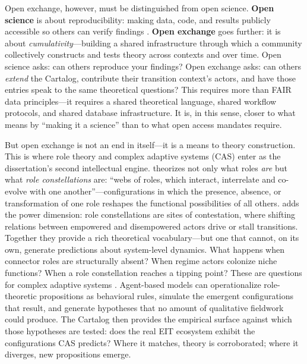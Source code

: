 \documentclass[../main.tex]{subfiles}
\begin{document}
Open exchange, however, must be distinguished from open science. \textbf{Open science} is about reproducibility: making data, code, and results publicly accessible so others can verify findings \parencite{nosek2015promoting}. \textbf{Open exchange} goes further: it is about \emph{cumulativity}---building a shared infrastructure through which a community collectively constructs and tests theory across contexts and over time. Open science asks: can others reproduce your findings? Open exchange asks: can others \emph{extend} the Cartalog, contribute their transition context's actors, and have those entries speak to the same theoretical questions? This requires more than FAIR data principles---it requires a shared theoretical language, shared workflow protocols, and shared database infrastructure. It is, in this sense, closer to what \textcite{dehaan2025makingscience} means by ``making it a science'' than to what open access mandates require.

But open exchange is not an end in itself---it is a means to theory construction. This is where role theory and complex adaptive systems (CAS) enter as the dissertation's second intellectual engine. \textcite{wittmayer2017roles} theorizes not only what roles \emph{are} but what \emph{role constellations} are: ``webs of roles, which interact, interrelate and co-evolve with one another''---configurations in which the presence, absence, or transformation of one role reshapes the functional possibilities of all others. \textcite{avelino2014shifting} adds the power dimension: role constellations are sites of contestation, where shifting relations between empowered and disempowered actors drive or stall transitions. Together they provide a rich theoretical vocabulary---but one that cannot, on its own, generate predictions about system-level dynamics. What happens when connector roles are structurally absent? When regime actors colonize niche functions? When a role constellation reaches a tipping point? These are questions for complex adaptive systems \parencite{geels2019typology,levin1998ecosystems}. Agent-based models can operationalize role-theoretic propositions as behavioral rules, simulate the emergent configurations that result, and generate hypotheses that no amount of qualitative fieldwork could produce. The Cartalog then provides the empirical surface against which those hypotheses are tested: does the real EIT ecosystem exhibit the configurations CAS predicts? Where it matches, theory is corroborated; where it diverges, new propositions emerge.
\end{document}
